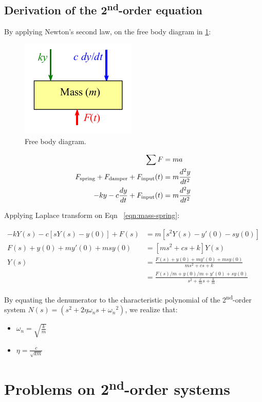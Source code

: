 \documentclass[a4paper,11pt]{book}
\begin{document}
\subsection*{Derivation of the 2\textsuperscript{nd}-order equation}

By applying Newton's second law, on the free body diagram in \ref{fig:freebody}:

\begin{figure}[h!]\label{fig:freebody}
\centering
  \includegraphics[width=0.3\linewidth]{newton}
  \caption{Free body diagram.} 
\end{figure}

\begin{align}
\sum F &= m a \\ 
F_{\rm spring} + F_{\rm damper} + F_{\rm input}(t) &= m \frac{d^2y}{dt^2} \\ 
-ky -c \frac{dy}{dt} + F_{\rm input}(t) &= m \frac{d^2y}{dt^2} \label{eqn:mass-spring}
\end{align}

Applying Laplace transform on Eqn ~\ref{eqn:mass-spring}:

\begin{align*}
-kY(s) - c\left[sY(s)-y(0)\right] + F(s) &= m\left[s^2Y(s)-y'(0)-sy(0)\right] \\
F(s) + y(0) + my'(0)+msy(0) &= \left[ms^2+cs+k\right]Y(s) \\
Y(s) &= \frac{F(s) + y(0) + my'(0)+msy(0)}{ms^2+cs+k} \\
&= \frac{F(s)/m + y(0)/m + y'(0)+sy(0)}{s^2+\frac{c}{m}s+ \frac{k}{m}}
\end{align*}

By equating the denumerator to the characteristic polynomial of the 2\textsuperscript{nd}-order system $N(s)=(s^2 + 2 \eta \omega_n s + {\omega_n}^2)$, we realize that:
\begin{itemize}
\item $\omega_n=\sqrt{\frac{k}{m}}$
\item $\eta = \frac{c}{\sqrt{km}}$
\end{itemize} 



\section*{Problems on 2\textsuperscript{nd}-order systems}
\end{document}
